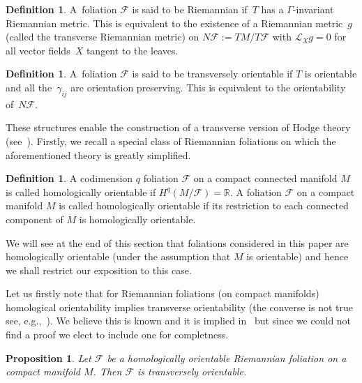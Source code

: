 \documentclass[10pt,a4paper]{amsart}
\numberwithin{equation}{section}
\newtheorem{prop}[tw]{Proposition}
\theoremstyle{definition}
\newtheorem{defi}[tw]{Definition}
\begin{document}
\begin{defi}
A~foliation $\mathcal{F}$ is said to be Riemannian if~$T$ has a $\Gamma$-invariant Riemannian metric. This is equivalent to the existence of a Riemannian metric~$g$ (called the transverse Riemannian metric) on $N\mathcal{F}:=TM\slash T\mathcal{F}$ with $\mathcal{L}_Xg=0$ for all vector fields~$X$ tangent to the leaves.
\end{defi}
\begin{defi}
A~foliation $\mathcal{F}$ is said to be transversely orientable if $T$ is orientable and all the~$\gamma_{ij}$ are orientation preserving. This is equivalent to the orientability of~$N\mathcal{F}$.
\end{defi}
These structures enable the construction of a transverse version of Hodge theory (see~\cite{E1}). Firstly, we recall a special class of Riemannian foliations on which the aforementioned theory is greatly simplified.

\begin{defi} A codimension $q$ foliation $\mathcal{F}$ on a compact connected manifold $M$ is called homologically orientable if $H^{q}(M\slash\mathcal{F})=\mathbb{R}$. A foliation $\mathcal{F}$ on a compact manifold $M$ is called homologically orientable if its restriction to each connected component of $M$ is homologically orientable.
\end{defi}
We will see at the end of this section that foliations considered in this paper are homologically orientable (under the assumption that $M$ is orientable) and hence we shall restrict our exposition to this case.

Let us firstly note that for Riemannian foliations (on compact manifolds) homological orientability implies transverse orientability (the converse is not true see, e.g.,~\cite{E1}). We believe this is known and it is implied in~\cite{E1} but since we could not find a proof we elect to include one for completness.
\begin{prop} Let $\mathcal{F}$ be a homologically orientable Riemannian foliation on a compact manifold $M$. Then $\mathcal{F}$ is transversely orientable.
\end{prop}
\end{document}
